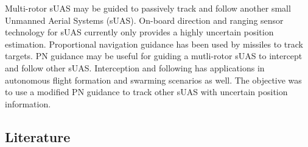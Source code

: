 \documentclass[conference]{IEEEtran}
\begin{document}
Multi-rotor sUAS may be guided to passively track and follow another small Unmanned Aerial Systems (sUAS). On-board direction and ranging sensor technology for sUAS currently only provides a highly uncertain position estimation. Proportional navigation guidance has been used by missiles to track targets. PN guidance may be useful for guiding a mutli-rotor sUAS to intercept and follow other sUAS. Interception and following has applications in autonomous flight formation and swarming scenarios as well. The objective was to use a modified PN guidance to track other sUAS with uncertain position information.

\subsection{Literature}






\end{document}
